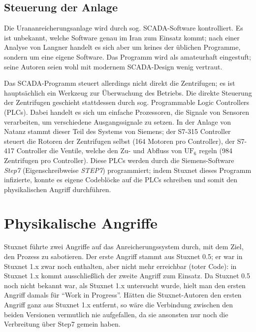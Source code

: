 \documentclass[a4paper]{article}
\begin{document}
\subsection{Steuerung der Anlage}

Die Urananreicherungsanlage wird durch sog. SCADA-Software kontrolliert.
Es ist unbekannt, welche Software genau im Iran zum Einsatz kommt;
nach einer Analyse von Langner\cite{tkac} handelt es sich aber um keines der üblichen Programme, %
sondern um eine eigene Software.
Das Programm wird als amateurhaft eingestuft;
seine Autoren seien wohl mit modernem SCADA-Design wenig vertraut. %

Das SCADA-Programm steuert allerdings nicht direkt die Zentrifugen;
es ist hauptsächlich ein Werkzeug zur Überwachung des Betriebs. %
Die direkte Steuerung der Zentrifugen geschieht stattdessen durch sog. Programmable Logic Controllers (PLCs).
Dabei handelt es sich um einfache Prozessoren, die Signale von Sensoren verarbeiten,
um verschiedene Ausgangssignale zu setzen.
In der Anlage von Natanz stammt dieser Teil des Systems von Siemens;
der S7-315 Controller steuert die Rotoren der Zentrifugen selbst (164 Motoren pro Controller), %
der S7-417 Controller die Ventile, welche den Zu- und Abfluss von $\mathrm{UF}_6$ regeln (984 Zentrifugen pro Controller).
Diese PLCs werden durch die Siemens-Software \emph{Step7} (Eigenschreibweise \emph{STEP7}) programmiert;
indem Stuxnet dieses Programm infizierte, konnte es eigene Codeblöcke auf die PLCs schreiben
und somit den physikalischen Angriff durchführen.

\section{Physikalische Angriffe}

Stuxnet führte zwei Angriffe auf das Anreicherungssystem durch, mit dem Ziel, den Prozess zu sabotieren.
Der erste Angriff stammt aus Stuxnet 0.5;
er war in Stuxnet 1.x zwar noch enthalten, aber nicht mehr erreichbar (toter Code):
in Stuxnet 1.x kommt ausschließlich der zweite Angriff zum Einsatz.
Da Stuxnet 0.5 noch nicht bekannt war, als Stuxnet 1.x untersucht wurde,
hielt man den ersten Angriff damals für ``Work in Progress''.\cite{dossier} %
Hätten die Stuxnet-Autoren den ersten Angriff ganz aus Stuxnet 1.x entfernt,
so wäre die Verbindung zwischen den beiden Versionen vermutlich nie aufgefallen,
da sie ansonsten nur noch die Verbreitung über Step7 gemein haben.\cite{05} %
\end{document}
